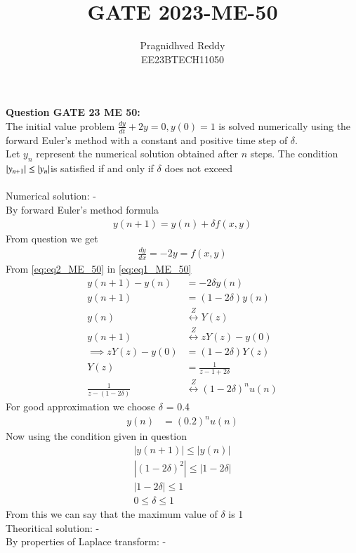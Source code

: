 \documentclass[journal,12pt,twocolumn]{IEEEtran}
\title{GATE 2023-ME-50}
\author{Pragnidhved Reddy\\EE23BTECH11050}
\date{}
\begin{document}
\maketitle
\newpage
\bigskip
\textbf{Question GATE 23 ME 50:}\\
The initial value problem
$\frac{dy}{dt}+2y=0, y(0)=1 $
is solved numerically using the forward Euler's method with a constant and positive time step of $\delta $.\\
Let $y_n$ represent the numerical solution obtained after $n$ steps. The condition $\left\vert y_{n+1}\right\vert \leq \left\vert y_n\right\vert$is satisfied if and only if $\delta$ does not exceed\\
\solution \\
\fi
Numerical solution: -\\
By forward Euler's method formula 
\begin{align}
\label{eq:eq1_ME_50}
    y(n+1)=y(n)+\delta  f(x,y)
\end{align}
From question we get
\begin{align}
\label{eq:eq2_ME_50}
\frac{dy}{dx}=-2y=f(x,y)
\end{align}
From \eqref{eq:eq2_ME_50} in \eqref{eq:eq1_ME_50}
\begin{align}
y(n+1)-y(n)&=-2\delta y(n)\\
y(n+1)&=(1-2\delta)y(n)\\
y(n)&\overset{Z}\longleftrightarrow Y(z)\\
y(n+1)&\overset{Z}\longleftrightarrow zY(z)-y(0)\\
\implies zY(z)-y(0)&=(1-2\delta)Y(z)\\
Y(z)&=\frac{1}{z-1+2\delta}\\
\frac{1}{z-(1-2\delta)}&\overset{Z}\longleftrightarrow (1-2\delta)^{n}u(n)
\end{align}
For good approximation we choose $\delta$ = 0.4
\begin{align}
y(n)&=(0.2)^nu(n)
\end{align}
Now using the condition given in question
\begin{align}
|y(n+1)| \leq |y(n)|\\
|(1-2\delta)^2| \leq |1-2\delta|\\
|1-2\delta| \leq 1 \\
0 \leq \delta \leq 1
\end{align}
From this we can say that the maximum value of $\delta  $ is 1\\
Theoritical solution: -\\
By properties of Laplace transform: -
\end{document}
